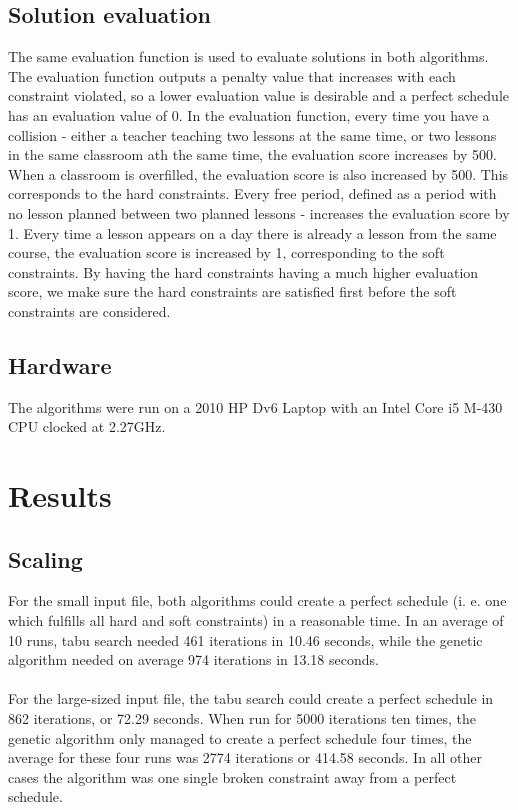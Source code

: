 \documentclass[titlepage,a4paper]{article}
\begin{document}
\subsection{Solution evaluation}
The same evaluation function is used to evaluate solutions in both algorithms. The evaluation function outputs a penalty value that increases with each constraint violated, so a lower evaluation value is desirable and a perfect schedule has an evaluation value of 0. In the evaluation function, every time you have a collision - either a teacher teaching two lessons at the same time, or two lessons in the same classroom ath the same time, the evaluation score increases by 500. When a classroom is overfilled, the evaluation score is also increased by 500. This corresponds to the hard constraints. Every free period, defined as a period with no lesson planned between two planned lessons - increases the evaluation score by 1. Every time a lesson appears on a day there is already a lesson from the same course, the evaluation score is increased by 1, corresponding to the soft constraints. By having the hard constraints having a much higher evaluation score, we make sure the hard constraints are satisfied first before the soft constraints are considered.

\subsection{Hardware}
The algorithms were run on a 2010 HP Dv6 Laptop with an Intel Core i5 M-430 CPU clocked at 2.27GHz.

\pagebreak
\section{Results}
\subsection{Scaling}
For the small input file, both algorithms could create a perfect schedule (i. e. one which fulfills all hard and soft constraints) in a reasonable time. In an average of 10 runs, tabu search needed 461 iterations in 10.46 seconds, while the genetic algorithm needed on average 974 iterations in 13.18 seconds. \\\\
For the large-sized input file, the tabu search could create a perfect schedule in 862 iterations, or 72.29 seconds. When run for 5000 iterations ten times, the genetic algorithm only managed to create a perfect schedule four times, the average for these four runs was 2774 iterations or 414.58 seconds. In all other cases the algorithm was one single broken constraint away from a perfect schedule. \\\\
\end{document}
